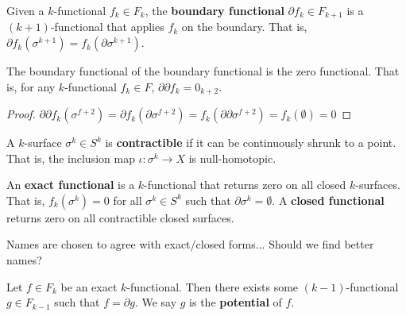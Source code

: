 \begin{defn}
	Given a $k$-functional $f_k \in F_k$, the \textbf{boundary functional} $\partial f_k \in F_{k+1}$ is a $(k+1)$-functional that applies $f_k$ on the boundary. That is, $\partial f_k(\sigma^{k+1}) = f_k(\partial \sigma^{k+1})$. 
\end{defn}

\begin{coro}
	The boundary functional of the boundary functional is the zero functional. That is, for any $k$-functional $f_k \in F$, $\partial \partial f_k = 0_{k+2}$.
\end{coro}

\begin{proof}
	$\partial \partial f_k (\sigma ^{f+2}) = \partial f_k (\partial \sigma ^{f+2}) = f_k (\partial \partial \sigma ^{f+2}) = f_k(\emptyset) = 0$
\end{proof}

\begin{defn}
	A $k$-surface $\sigma^k \in S^k$ is \textbf{contractible} if it can be continuously shrunk to a point. That is, the inclusion map $\iota : \sigma^k \to X$ is null-homotopic.
\end{defn}

\begin{defn}
	An \textbf{exact functional} is a $k$-functional that returns zero on all closed $k$-surfaces. That is, $f_k(\sigma^k) = 0$ for all $\sigma^k \in S^k$ such that $\partial\sigma^k = \emptyset$. A \textbf{closed functional} returns zero on all contractible closed surfaces.
\end{defn}

\begin{remark}
	Names are chosen to agree with exact/closed forms... Should we find better names?
\end{remark}

\begin{prop}
	Let $f \in F_k$ be an exact $k$-functional. Then there exists some $(k-1)$-functional $g \in F_{k-1}$ such that $f = \partial g$. We say $g$ is the \textbf{potential} of $f$.
\end{prop}

